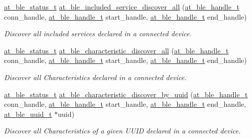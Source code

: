 \begin{DoxyCompactItemize}
\mbox{\hyperlink{group__error__codes__group_ga3b1db9b95feb157b3c188ca27fe76988}{at\+\_\+ble\+\_\+status\+\_\+t}} \mbox{\hyperlink{group__gatt__client__group_ga1937df46ff17c4490585d1ca540bc8fe}{at\+\_\+ble\+\_\+included\+\_\+service\+\_\+discover\+\_\+all}} (\mbox{\hyperlink{at__ble__api_8h_abd23646d0c662860741f787efc8456f2}{at\+\_\+ble\+\_\+handle\+\_\+t}} conn\+\_\+handle, \mbox{\hyperlink{at__ble__api_8h_abd23646d0c662860741f787efc8456f2}{at\+\_\+ble\+\_\+handle\+\_\+t}} start\+\_\+handle, \mbox{\hyperlink{at__ble__api_8h_abd23646d0c662860741f787efc8456f2}{at\+\_\+ble\+\_\+handle\+\_\+t}} end\+\_\+handle)
\begin{DoxyCompactList}\small\item\em Discover all included services declared in a connected device. \end{DoxyCompactList}\item 
\mbox{\hyperlink{group__error__codes__group_ga3b1db9b95feb157b3c188ca27fe76988}{at\+\_\+ble\+\_\+status\+\_\+t}} \mbox{\hyperlink{group__gatt__client__group_ga219f9e312abd98aa41c5cce56fcc1dde}{at\+\_\+ble\+\_\+characteristic\+\_\+discover\+\_\+all}} (\mbox{\hyperlink{at__ble__api_8h_abd23646d0c662860741f787efc8456f2}{at\+\_\+ble\+\_\+handle\+\_\+t}} conn\+\_\+handle, \mbox{\hyperlink{at__ble__api_8h_abd23646d0c662860741f787efc8456f2}{at\+\_\+ble\+\_\+handle\+\_\+t}} start\+\_\+handle, \mbox{\hyperlink{at__ble__api_8h_abd23646d0c662860741f787efc8456f2}{at\+\_\+ble\+\_\+handle\+\_\+t}} end\+\_\+handle)
\begin{DoxyCompactList}\small\item\em Discover all Characteristics declared in a connected device. \end{DoxyCompactList}\item 
\mbox{\hyperlink{group__error__codes__group_ga3b1db9b95feb157b3c188ca27fe76988}{at\+\_\+ble\+\_\+status\+\_\+t}} \mbox{\hyperlink{group__gatt__client__group_ga5bd8e51454cede0adcbf0b99eda34f0a}{at\+\_\+ble\+\_\+characteristic\+\_\+discover\+\_\+by\+\_\+uuid}} (\mbox{\hyperlink{at__ble__api_8h_abd23646d0c662860741f787efc8456f2}{at\+\_\+ble\+\_\+handle\+\_\+t}} conn\+\_\+handle, \mbox{\hyperlink{at__ble__api_8h_abd23646d0c662860741f787efc8456f2}{at\+\_\+ble\+\_\+handle\+\_\+t}} start\+\_\+handle, \mbox{\hyperlink{at__ble__api_8h_abd23646d0c662860741f787efc8456f2}{at\+\_\+ble\+\_\+handle\+\_\+t}} end\+\_\+handle, \mbox{\hyperlink{structat__ble__uuid__t}{at\+\_\+ble\+\_\+uuid\+\_\+t}} $\ast$uuid)
\begin{DoxyCompactList}\small\item\em Discover all Characteristics of a given U\+U\+ID declared in a connected device. \end{DoxyCompactList}\item 

\end{DoxyCompactItemize}
